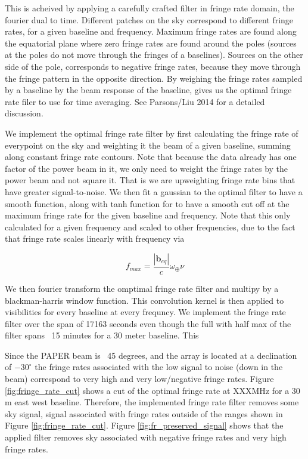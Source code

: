 \documentclass[twocolumn,numberedappendix]{emulateapj}
\begin{document}
This is acheived by applying a carefully crafted filter in fringe rate domain,
the fourier dual to time. Different patches on the sky correspond to different
fringe rates, for a given baseline and frequency. Maximum fringe rates are found
along the equatorial plane where zero fringe rates are found around the poles
(sources at the poles do not move through the fringes of a baselines). Sources
on the other side of the pole, corresponds to negative fringe rates, because
they move through the fringe pattern in the opposite direction. By weighing the
fringe rates sampled by a baseline by the beam response of the baseline, gives
us the optimal fringe rate filer to use for time averaging. See Parsons/Liu 2014
for a detailed discussion.

We implement the optimal fringe rate filter by first calculating the fringe rate
of everypoint on the sky and weighting it the beam of a given baseline, summing
along constant fringe rate contours. Note that because the data already has one
factor of the power beam in it, we only need to weight the fringe rates by the
power beam and not square it. That is we are upweighting fringe rate bins that
have greater signal-to-noise.  We then fit a gaussian to the optimal filter to
have a smooth function, along with tanh function for to have a smooth cut off
at the maximum fringe rate for the given baseline and frequency.  Note that
this only calculated for a given frequency and scaled to other frequencies, due
to the fact that fringe rate scales linearly with frequency via

\begin{equation}
    f_{max} = \frac{|\mathbf{b}_{eq}|}{c}\omega_{\oplus}\nu
\end{equation}


We then fourier transform the omptimal fringe rate filter and multipy by a
blackman-harris window function. This convolution kernel is then applied to 
visibilities for every baseline at every frequncy. We implement the fringe rate
filter over the span of 17163 seconds even though the full with half max of the
filter spans ~15 minutes for a 30 meter baseline. This 

Since the PAPER beam is ~45 degrees, and the array is located at a declination
of $-30^{\circ}$ the fringe rates associated with the low signal to noise (down
in the beam) correspond to very high and very low/negative fringe rates. Figure
\ref{fig:fringe_rate_cut} shows a cut of the optimal fringe rate at XXXMHz for a 30
m east west baseline. Therefore, the implemented fringe rate filter removes some
sky signal, signal associated with fringe rates outside of the ranges shown in
Figure \ref{fig:fringe_rate_cut}. Figure \ref{fig:fr_preserved_signal} shows
that the applied filter removes sky associated with negative fringe rates and
very high fringe rates. 
\end{document}
